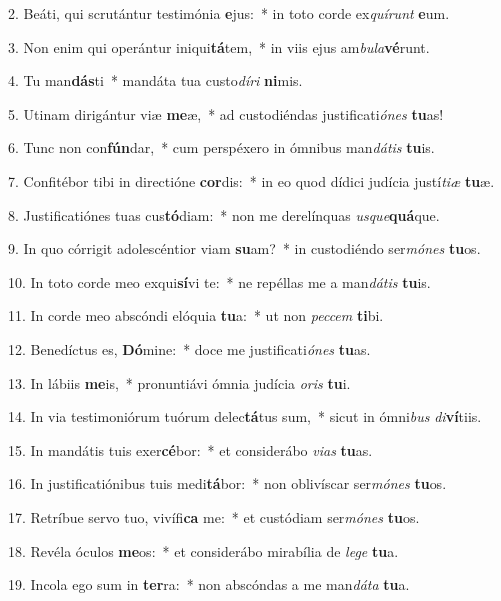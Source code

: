 2. Beáti, qui scrutántur testimónia \textbf{e}jus:~*  in toto corde ex\textit{quí}\textit{runt} \textbf{e}um.\

3. Non enim qui operántur iniqui\textbf{tá}tem,~*  in viis ejus am\textit{bu}\textit{la}\textbf{vé}runt.\

4. Tu man\textbf{dás}ti~*  mandáta tua custo\textit{dí}\textit{ri} \textbf{ni}mis.\

5. Utinam dirigántur viæ \textbf{me}æ,~*  ad custodiéndas justificati\textit{ó}\textit{nes} \textbf{tu}as!\

6. Tunc non con\textbf{fún}dar,~*  cum perspéxero in ómnibus man\textit{dá}\textit{tis} \textbf{tu}is.\

7. Confitébor tibi in directióne \textbf{cor}dis:~*  in eo quod dídici judícia justí\textit{ti}\textit{æ} \textbf{tu}æ.\

8. Justificatiónes tuas cus\textbf{tó}diam:~*  non me derelínquas \textit{us}\textit{que}\textbf{quá}que.\

9. In quo córrigit adolescéntior viam \textbf{su}am?~*  in custodiéndo ser\textit{mó}\textit{nes} \textbf{tu}os.\

10. In toto corde meo exqui\textbf{sí}vi te:~*  ne repéllas me a man\textit{dá}\textit{tis} \textbf{tu}is.\

11. In corde meo abscóndi elóquia \textbf{tu}a:~*  ut non \textit{pec}\textit{cem} \textbf{ti}bi.\

12. Benedíctus es, \textbf{Dó}mine:~*  doce me justificati\textit{ó}\textit{nes} \textbf{tu}as.\

13. In lábiis \textbf{me}is,~*  pronuntiávi ómnia judícia \textit{o}\textit{ris} \textbf{tu}i.\

14. In via testimoniórum tuórum delec\textbf{tá}tus sum,~*  sicut in ómni\textit{bus} \textit{di}\textbf{ví}tiis.\

15. In mandátis tuis exer\textbf{cé}bor:~*  et considerábo \textit{vi}\textit{as} \textbf{tu}as.\

16. In justificatiónibus tuis medi\textbf{tá}bor:~*  non oblivíscar ser\textit{mó}\textit{nes} \textbf{tu}os.\

17. Retríbue servo tuo, vivífi\textbf{ca} me:~*  et custódiam ser\textit{mó}\textit{nes} \textbf{tu}os.\

18. Revéla óculos \textbf{me}os:~*  et considerábo mirabília de \textit{le}\textit{ge} \textbf{tu}a.\

19. Incola ego sum in \textbf{ter}ra:~*  non abscóndas a me man\textit{dá}\textit{ta} \textbf{tu}a.\

